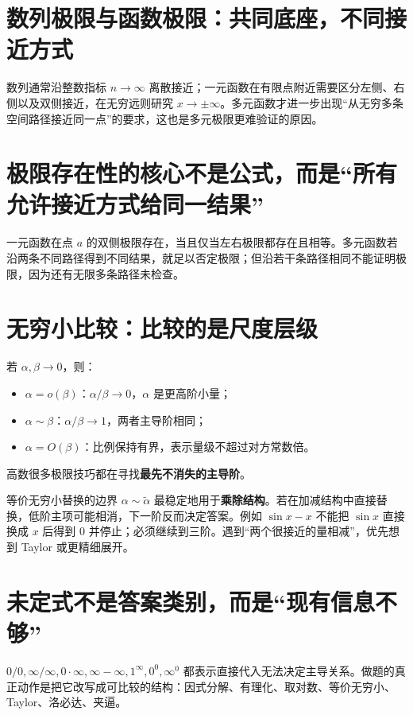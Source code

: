 \documentclass[11pt,a4paper,openany]{ctexbook}
\newcommand{\key}[1]{\textbf{\color{deep}#1}}
\begin{document}
\section{数列极限与函数极限：共同底座，不同接近方式}
数列通常沿整数指标 $n\to\infty$ 离散接近；一元函数在有限点附近需要区分左侧、右侧以及双侧接近，在无穷远则研究 $x\to\pm\infty$。多元函数才进一步出现“从无穷多条空间路径接近同一点”的要求，这也是多元极限更难验证的原因。

\section{极限存在性的核心不是公式，而是“所有允许接近方式给同一结果”}
一元函数在点 $a$ 的双侧极限存在，当且仅当左右极限都存在且相等。多元函数若沿两条不同路径得到不同结果，就足以否定极限；但沿若干条路径相同不能证明极限，因为还有无限多条路径未检查。

\section{无穷小比较：比较的是尺度层级}
若 $\alpha,\beta\to0$，则：
\begin{itemize}
  \item $\alpha=o(\beta)$：$\alpha/\beta\to0$，$\alpha$ 是更高阶小量；
  \item $\alpha\sim\beta$：$\alpha/\beta\to1$，两者主导阶相同；
  \item $\alpha=O(\beta)$：比例保持有界，表示量级不超过对方常数倍。
\end{itemize}
高数很多极限技巧都在寻找\key{最先不消失的主导阶}。

\begin{warnbox}{等价无穷小替换的边界}
$\alpha\sim\tilde\alpha$ 最稳定地用于\key{乘除结构}。若在加减结构中直接替换，低阶主项可能相消，下一阶反而决定答案。例如 $\sin x-x$ 不能把 $\sin x$ 直接换成 $x$ 后得到 0 并停止；必须继续到三阶。遇到“两个很接近的量相减”，优先想到 Taylor 或更精细展开。
\end{warnbox}

\section{未定式不是答案类别，而是“现有信息不够”}
$0/0,\infty/\infty,0\cdot\infty,\infty-\infty,1^\infty,0^0,\infty^0$ 都表示直接代入无法决定主导关系。做题的真正动作是把它改写成可比较的结构：因式分解、有理化、取对数、等价无穷小、Taylor、洛必达、夹逼。
\end{document}
